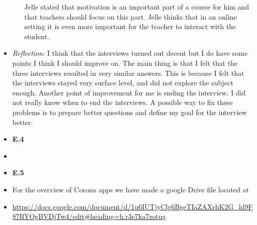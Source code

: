 \documentclass{article}
\begin{document}
\begin{itemize}
\begin{itemize}
        Jelle stated that motivation is an important part of a course for him and 
        that teachers should focus on this part. Jelle thinks that in an online 
        setting it is even more important for the teacher to interact with the student. 
    \end{itemize} 
    \item[] \textit{Reflection:} I think that the interviews turned out decent but 
    I do have some points I think I should improve on. The main thing is that I felt 
    that the three interviews resulted in very similar answers. This is because I 
    felt that the interviews stayed very surface level, and did not explore the 
    subject enough. Another point of improvement for me is ending the interview.
    I did not really know when to end the interviews. A possible way to fix these 
    problems is to prepare better questions and define my goal for the interview better. 
    \item[] \textbf{E.4}
    \item[] 
    \item[] \textbf{E.5}
    \item[] For the overview of Corona apps we have made a google Drive file located at
    \item[] \url{https://docs.google.com/document/d/1u6IUTjyClg6BgeTIaZAXrhK2G_hl9F87RYOgBVDjTw4/edit#heading=h.r3e7ka7zotug}
\end{itemize}
\end{document}
